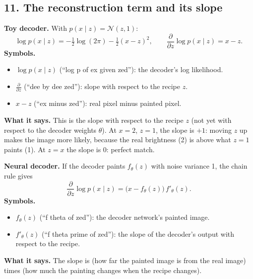 \subsection*{11. The reconstruction term and its slope}

\textbf{Toy decoder.} With $p(x \mid z) = \mathcal{N}(z, 1)$:
\[
\log p(x \mid z) = -\tfrac{1}{2}\log(2\pi) - \tfrac{1}{2}(x - z)^2,
\qquad
\frac{\partial}{\partial z}\log p(x \mid z) = x - z.
\]
\textbf{Symbols.}
\begin{itemize}[leftmargin=1.5em, itemsep=0pt]
\item $\log p(x \mid z)$ (``log p of ex given zed''): the decoder's log likelihood.
\item $\frac{\partial}{\partial z}$ (``dee by dee zed''): slope with respect to the recipe $z$.
\item $x - z$ (``ex minus zed''): real pixel minus painted pixel.
\end{itemize}
\textbf{What it says.} This is the slope with respect to the recipe $z$ (not yet with respect to the decoder weights $\theta$). At $x = 2$, $z = 1$, the slope is $+1$: moving $z$ up makes the image more likely, because the real brightness (2) is above what $z = 1$ paints (1). At $z = x$ the slope is 0: perfect match.

\textbf{Neural decoder.} If the decoder paints $f_\theta(z)$ with noise variance 1, the chain rule gives
\[
\frac{\partial}{\partial z}\log p(x \mid z) = \big(x - f_\theta(z)\big)\, f'_\theta(z).
\]
\textbf{Symbols.}
\begin{itemize}[leftmargin=1.5em, itemsep=0pt]
\item $f_\theta(z)$ (``f theta of zed''): the decoder network's painted image.
\item $f'_\theta(z)$ (``f theta prime of zed''): the slope of the decoder's output with respect to the recipe.
\end{itemize}
\textbf{What it says.} The slope is (how far the painted image is from the real image) times (how much the painting changes when the recipe changes).

